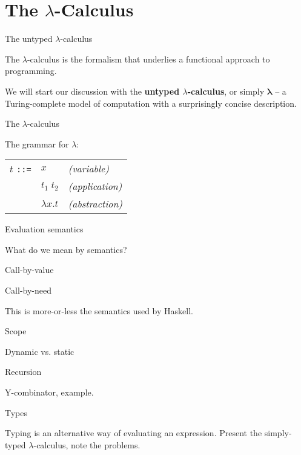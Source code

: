 
\section{The $\lambda$-Calculus}

%
\begin{frame}{The untyped $\lambda$-calculus}

The $\lambda$-calculus is the formalism that underlies a functional approach to
programming.

We will start our discussion with the \textbf{untyped $\lambda$-calculus}, or
simply $\mathbf{\lambda}$ -- a Turing-complete model of computation with a
surprisingly concise description.

\end{frame}

%
\begin{frame}{The $\lambda$-calculus}

The grammar for $\lambda$:

\begin{tabular}{lll}
  $t$ \texttt{::=} & $x$              & \emph{(variable)} \\
                   & $t_1 \; t_2$     & \emph{(application)} \\
                   & $\lambda x . t$  & \emph{(abstraction)} \\
\end{tabular}

\end{frame}

%
\begin{frame}{Evaluation semantics}

What do we mean by semantics?

\end{frame}

%
\begin{frame}{Call-by-value}



\end{frame}

%
\begin{frame}{Call-by-need}

This is more-or-less the semantics used by Haskell.

\end{frame}

%
\begin{frame}{Scope}

Dynamic vs. static

\end{frame}

%
\begin{frame}{Recursion}

Y-combinator, example.

\end{frame}

%
\begin{frame}{Types}

Typing is an alternative way of evaluating an expression. Present the
simply-typed $\lambda$-calculus, note the problems.

\end{frame}

